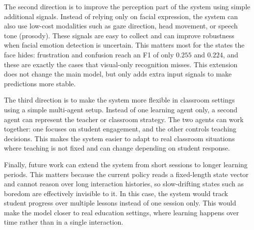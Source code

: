 The second direction is to improve the perception part of the system using simple additional signals. Instead of relying only on facial expression, the system can also use low-cost modalities such as gaze direction, head movement, or speech tone (prosody). These signals are easy to collect and can improve robustness when facial emotion detection is uncertain. This matters most for the states the face hides: frustration and confusion reach an F1 of only $0.255$ and $0.224$, and these are exactly the cases that visual-only recognition misses. This extension does not change the main model, but only adds extra input signals to make predictions more stable.

The third direction is to make the system more flexible in classroom settings using a simple multi-agent setup. Instead of one learning agent only, a second agent can represent the teacher or classroom strategy. The two agents can work together: one focuses on student engagement, and the other controls teaching decisions. This makes the system easier to adapt to real classroom situations where teaching is not fixed and can change depending on student response.

Finally, future work can extend the system from short sessions to longer learning periods. This matters because the current policy reads a fixed-length state vector and cannot reason over long interaction histories, so slow-drifting states such as boredom are effectively invisible to it. In this case, the system would track student progress over multiple lessons instead of one session only. This would make the model closer to real education settings, where learning happens over time rather than in a single interaction.